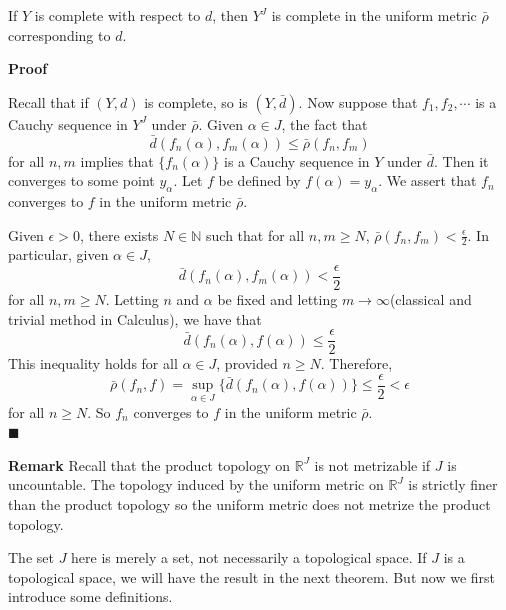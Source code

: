 \documentclass[main.tex]{subfiles}
\begin{document}
\begin{theorem}
    \label{thm:uniformComplete}
    If $Y$ is complete with respect to $d$, then $Y^J$ is complete in the uniform metric $\bar{\rho}$ corresponding to $d$. 
\end{theorem}
\par \noindent \textbf{Proof} 
\par Recall that if $(Y, d)$ is complete, so is $(Y, \bar{d})$. Now suppose that $f_1, f_2, \cdots$ is a Cauchy sequence in $Y^J$ under $\bar{\rho}$. Given $\alpha\in J$, the fact that 
\begin{equation}
    \bar{d}(f_n(\alpha), f_m(\alpha)) \leq \bar{\rho}(f_n, f_m)
\end{equation}
for all $n, m$ implies that $\{f_n(\alpha)\}$ is a Cauchy sequence in $Y$ under $\bar{d}$. Then it converges to some point $y_{\alpha}$. Let $f$ be defined by $f(\alpha) = y_{\alpha}$. We assert that $f_n$ converges to $f$ in the uniform metric $\bar{\rho}$. 
\par Given $\epsilon > 0$, there exists $N \in \mathbb{N}$ such that for all $n, m \geq N$, $\bar{\rho}(f_n, f_m) < \frac{\epsilon }{2}$. In particular, given $\alpha \in J$,
\begin{equation}
    \bar{d}(f_n(\alpha), f_m(\alpha)) < \frac{\epsilon}{2}
\end{equation} 
for all $n, m \geq N$. Letting $n$ and $\alpha$ be fixed and letting $m \rightarrow \infty$(classical and trivial method in Calculus), we have that 
\begin{equation}
    \bar{d}(f_n(\alpha), f(\alpha)) \leq \frac{\epsilon}{2} 
\end{equation} 
This inequality holds for all $\alpha \in J$, provided $n \geq N$. Therefore, 
\begin{equation}
    \bar{\rho}(f_n, f) = \sup_{\alpha \in J} \{\bar{d}(f_n(\alpha), f(\alpha))\} \leq \frac{\epsilon}{2} < \epsilon
\end{equation}
for all $n \geq N$. So $f_n$ converges to $f$ in the uniform metric $\bar{\rho}$. 
\mbox{} \\ \null \hfill $\blacksquare$ 
\par \noindent \textbf{Remark} Recall that the product topology on $\mathbb{R}^J$ is not metrizable if $J$ is uncountable. The topology induced by the uniform metric on $\mathbb{R}^J$ is strictly finer than the product topology so the uniform metric does not metrize the product topology. 
\par The set $J$ here is merely a set, not necessarily a topological space. If $J$ is a topological space, we will have the result in the next theorem. But now we first introduce some definitions. 
\end{document}
